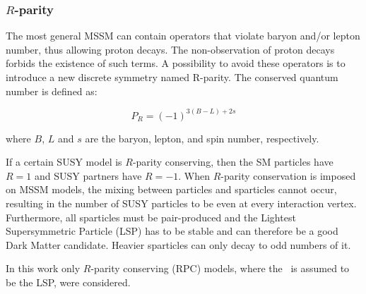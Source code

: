 
			\subsubsection*{$R$-parity}
				
				The most general MSSM can contain operators that violate baryon and/or lepton number, thus allowing proton decays. The non-observation of proton decays forbids the existence of such terms. A possibility to avoid these operators is to introduce a new discrete symmetry named R-parity. The conserved quantum number is defined as:

				\begin{equation}
					P_R = \left ( -1 \right )^{3 \left (B - L \right )+ 2s}
				\end{equation}

				\noindent where $B$, $L$ and $s$ are the baryon, lepton, and spin number, respectively.	

				If a certain SUSY model is $R$-parity conserving, then the SM particles have $R = 1$ and SUSY partners have $R=-1$. 
				When $R$-parity conservation is imposed on MSSM models, the mixing between particles and sparticles cannot occur, resulting in the number of SUSY particles to be even at every interaction vertex. 
				Furthermore, all sparticles must be pair-produced and the Lightest Supersymmetric Particle (LSP) has to be stable and can therefore be a good Dark Matter candidate. Heavier sparticles can only decay to odd numbers of it.

				In this work only $R$-parity conserving (RPC) models, where the \ninoone\ is assumed to be the LSP, were considered.




